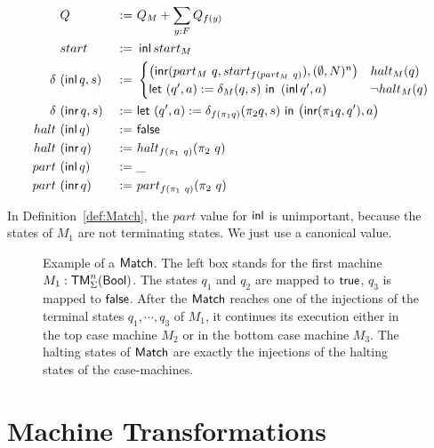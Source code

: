 \begin{definition}[$\MS{Match}~M~f$]
  \label{def:Match}
  \begin{alignat*}{3}
    & Q                  &~:=~& Q_M +  \sum_{y:F} Q_{f(y)} \\
    & start              &~:=~& \operatorname{\textsf{inl}} start_M \\
    \delta ~&(\operatorname{\textsf{inl}} q, s) &~:=~&
    \begin{cases}
      \bigl(\operatorname{\textsf{inr}} (part_M~q, start_{f (part_M~q)}), (\emptyset, N)^n \bigr) & halt_M(q) \\
      \textsf{let}~(q', a) := \delta_M(q, s)~\textsf{in}~\left(\operatorname{\textsf{inl}} q', a \right) & \lnot halt_M(q)
    \end{cases} \\
    \delta ~&(\operatorname{\textsf{inr}} q, s) &~:=~& \textsf{let}~(q', a) := \delta_{f(\pi_1 q)} (\pi_2 q, s)~\textsf{in}~\bigl( \operatorname{\textsf{inr}} (\pi_1 q, q'), a \bigr) \\
    halt   ~&(\operatorname{\textsf{inl}}  q)   &~:=~& \textsf{false} \\
    halt   ~&(\operatorname{\textsf{inr}}  q)   &~:=~& halt_{f(\pi_1~q)} (\pi_2~q) \\
    part   ~&(\operatorname{\textsf{inl}}  q)   &~:=~& \_ \\
    part   ~&(\operatorname{\textsf{inr}}  q)   &~:=~& part_{f(\pi_1~q)} (\pi_2~q)
  \end{alignat*}
\end{definition}

In Definition~\ref{def:Match}, the $part$ value for $\operatorname{\textsf{inl}}$ is unimportant, because the states of $M_1$ are not terminating states.  We just use a
canonical value.


\begin{figure}
  \center
  
  \caption{Example of a $\textsf{Match}$.  The left box stands for the first machine $M_1:\textsf{TM}_\Sigma^n(\textsf{Bool})$.  The states $q_1$ and $q_2$ are mapped to
    $\textsf{true}$, $q_3$ is mapped to $\textsf{false}$.  After the $\textsf{Match}$ reaches one of the injections of the terminal states $q_1, \cdots, q_3$ of $M_1$, it
    continues its execution either in the top case machine $M_2$ or in the bottom case machine $M_3$.  The halting states of $\textsf{Match}$ are exactly
    the injections of the halting states of the case-machines.}
  \label{fig:match}
\end{figure}





\section{Machine Transformations}
\label{sec:transformations}

